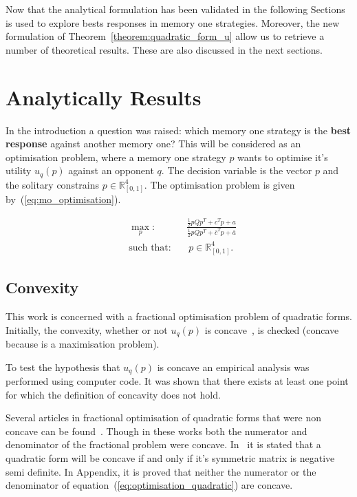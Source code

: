 \documentclass[10pt]{article}
\newcommand{\R}{\mathbb{R}}
\begin{document}
Now that the analytical formulation has been validated in the following Sections
is used to explore bests responses in memory one strategies. Moreover, the new
formulation of Theorem~\ref{theorem:quadratic_form_u} allow us to retrieve a number
of theoretical results. These are also discussed in the next sections.

\section{Analytically Results}

In the introduction a question was raised: which memory one strategy is the \textbf{best response}
against another memory one? This will be considered as an optimisation problem,
where a memory one strategy \(p\) wants to optimise it's utility \(u_q(p)\)
against an opponent \(q\). The decision variable is the vector \(p\) and the
solitary constrains \(p \in \R^4_{[0, 1]} \). The optimisation problem is
given by~(\ref{eq:mo_optimisation}).

\begin{equation}\label{eq:mo_optimisation}
\begin{aligned}
& \max_p: && \frac{\frac{1}{2}  p  Q  p^T + c^T p + a} 
                  {\frac{1}{2}  p  \bar{Q}  p^T + \bar{c}^T  p + \bar{a}}
\\
& \text{such that}: && \ p \in \R^4_{[0, 1]}.
\end{aligned}
\end{equation}

\subsection{Convexity}

This work is concerned with a fractional optimisation problem of quadratic forms.
Initially, the convexity, whether or not \(u_{q}(p)\) is concave~\cite{Gradshteyn2007},
is checked (concave because is a maximisation problem).

To test the hypothesis that \(u_q(p)\) is concave an empirical analysis
was performed using computer code. %
It was shown that there exists at least one point for which the definition of
concavity does not hold.

Several articles in fractional optimisation of quadratic forms that were non concave
can be found~\cite{Beck2009, Hongyan2014}. Though in these works both the numerator
and denominator of the fractional problem were concave. In~\cite{Anton2014} it is
stated that a quadratic form will be concave if and only if it's symmetric matrix is
negative semi definite. In Appendix, it is proved that neither the numerator or %
the denominator of equation~(\ref{eq:optimisation_quadratic}) are concave.
\end{document}
